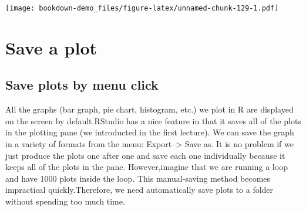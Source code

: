 \documentclass[]{book}
\newenvironment{Shaded}{\begin{snugshade}}{\end{snugshade}}
\newcommand{\KeywordTok}[1]{\textcolor[rgb]{0.13,0.29,0.53}{\textbf{#1}}}
\newcommand{\DataTypeTok}[1]{\textcolor[rgb]{0.13,0.29,0.53}{#1}}
\newcommand{\DecValTok}[1]{\textcolor[rgb]{0.00,0.00,0.81}{#1}}
\newcommand{\FloatTok}[1]{\textcolor[rgb]{0.00,0.00,0.81}{#1}}
\newcommand{\StringTok}[1]{\textcolor[rgb]{0.31,0.60,0.02}{#1}}
\newcommand{\CommentTok}[1]{\textcolor[rgb]{0.56,0.35,0.01}{\textit{#1}}}
\newcommand{\OtherTok}[1]{\textcolor[rgb]{0.56,0.35,0.01}{#1}}
\newcommand{\OperatorTok}[1]{\textcolor[rgb]{0.81,0.36,0.00}{\textbf{#1}}}
\newcommand{\NormalTok}[1]{#1}
\theoremstyle{definition}
\theoremstyle{definition}
\theoremstyle{definition}
\theoremstyle{remark}
\begin{document}
\begin{Shaded}
\end{Shaded}

\texttt{[image: bookdown-demo\_files/figure-latex/unnamed-chunk-129-1.pdf]}

\section{Save a plot}\label{save-a-plot}

\subsection{Save plots by menu click}\label{save-plots-by-menu-click}

All the graphs (bar graph, pie chart, histogram, etc.) we plot in R are
displayed on the screen by default.RStudio has a nice feature in that it
saves all of the plots in the plotting pane (we introducted in the first
lecture). We can save the graph in a variety of formats from the menu:
Export--\textgreater{} Save as. It is no problem if we just produce the
plots one after one and save each one individually because it keeps all
of the plots in the pane. However,imagine that we are running a loop and
have 1000 plots inside the loop. This manual-saving method becomes
impractical quickly.Therefore, we need automatically save plots to a
folder without spending too much time.
\end{document}
